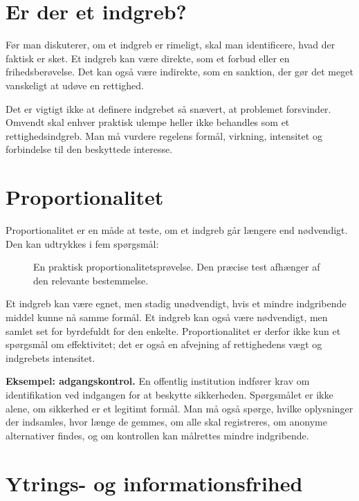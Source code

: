 \section{Er der et indgreb?}

Før man diskuterer, om et indgreb er rimeligt, skal man identificere, hvad der faktisk er sket. Et indgreb kan være direkte, som et forbud eller en frihedsberøvelse. Det kan også være indirekte, som en sanktion, der gør det meget vanskeligt at udøve en rettighed.

Det er vigtigt ikke at definere indgrebet så snævert, at problemet forsvinder. Omvendt skal enhver praktisk ulempe heller ikke behandles som et rettighedsindgreb. Man må vurdere regelens formål, virkning, intensitet og forbindelse til den beskyttede interesse.

\section{Proportionalitet}

Proportionalitet er en måde at teste, om et indgreb går længere end nødvendigt. Den kan udtrykkes i fem spørgsmål:

\begin{figure}[ht]
\centering

\caption{En praktisk proportionalitetsprøvelse. Den præcise test afhænger af den relevante bestemmelse.}
\label{fig:rights-test}
\end{figure}

Et indgreb kan være egnet, men stadig unødvendigt, hvis et mindre indgribende middel kunne nå samme formål. Et indgreb kan også være nødvendigt, men samlet set for byrdefuldt for den enkelte. Proportionalitet er derfor ikke kun et spørgsmål om effektivitet; det er også en afvejning af rettighedens vægt og indgrebets intensitet.

\begin{examplebox}
\textbf{Eksempel: adgangskontrol.} En offentlig institution indfører krav om identifikation ved indgangen for at beskytte sikkerheden. Spørgsmålet er ikke alene, om sikkerhed er et legitimt formål. Man må også spørge, hvilke oplysninger der indsamles, hvor længe de gemmes, om alle skal registreres, om anonyme alternativer findes, og om kontrollen kan målrettes mindre indgribende.
\end{examplebox}

\section{Ytrings- og informationsfrihed}

